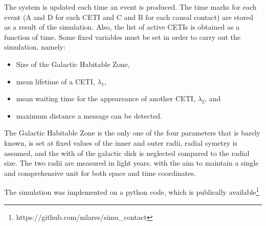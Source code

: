 \documentclass[crop]{CSLB}%
\begin{document}
The system is updated each time an event is produced.
%
The time marks for each event (A and D for each CETI and C and B for
each causal contact) are stored as a result of the simulation.
%
Also, the list of active CETIs is obtained as a function of time.
%
Some fixed variables must be set in order to carry out the simulation,
namely:

\begin{itemize}
   \item Size of the Galactic Habitable Zone,
   \item mean lifetime of a CETI, $\lambda_1$,
   \item mean waiting time for the appeareance of another CETI,
      $\lambda_2$, and
   \item maximum distance a message can be detected.
\end{itemize}

The Galactic Habitable Zone is the only one of the four parameters
that is barely known, is set at fixed values of the inner and
outer radii, radial symetry is assumed, and the with of the
galactic disk is neglected compared to the radial size.
%
The two radii are measured in light years, with the aim to maintain a
single and comprehensive unit for both space and time coordinates. 



The simulation was implemented on a python code, which is publically
available\footnote{https://github.com/mlares/simu\_contact}
\end{document}

